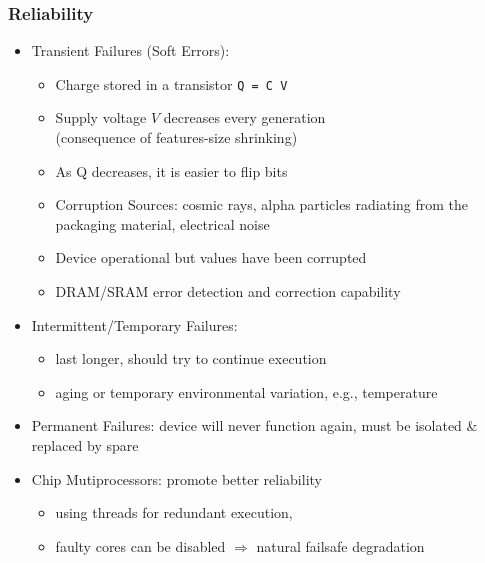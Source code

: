 \documentclass{beamer}
\renewcommand{\emph}[1]{\textcolor{structure}{#1}}
\newcommand{\emp}[1]{\textcolor{DikuRed}{ #1}}
\begin{document}
\begin{frame}[fragile,t]
\frametitle{Reliability}

\begin{itemize}
    \item \emp{Transient Failures (Soft Errors):}
        \begin{itemize}
            \item Charge stored in a transistor \emp{\tt Q = C V}
            \item Supply voltage $V$ decreases every generation\\
                    (consequence of features-size shrinking)
            \item As Q decreases, it is easier to flip bits
            \item Corruption Sources: cosmic rays, alpha particles
                    radiating from the packaging material, electrical noise
            \item Device operational but values have been corrupted
            \item DRAM/SRAM error detection and correction capability
        \end  {itemize}\medskip

    \item \emp{Intermittent/Temporary Failures:}
            \begin{itemize}
                \item last longer, should try to continue execution
                \item aging or temporary environmental variation, e.g., temperature
            \end  {itemize}\medskip

    \item \emp{Permanent Failures:} device will never function again,
                must be isolated \& replaced by spare\medskip

    \item \emph{Chip Mutiprocessors: promote better reliability}
            \begin{itemize}
                \item using threads for redundant execution, 
                \item faulty cores can be disabled $\Rightarrow$ 
                        natural failsafe degradation
            \end  {itemize}
\end  {itemize}
\end{frame}
\end{document}
